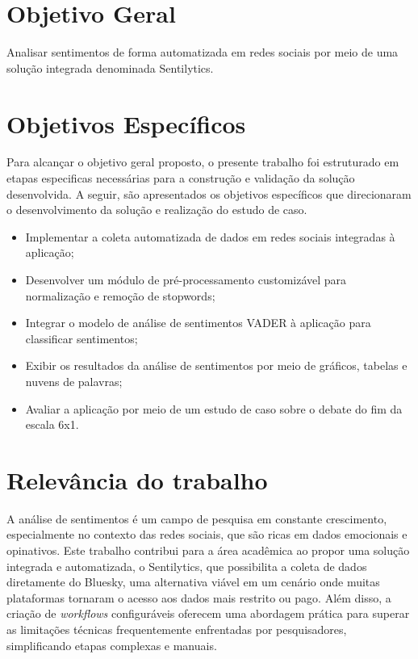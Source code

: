 \documentclass[
	12pt,				%
	oneside,			%
	a4paper,			%
	english,			%
	french,				%
	spanish,			%
	brazil				%
	]{abntex2}
\begin{document}
\hypertarget{objetivo-geral}{%
\section{Objetivo Geral}\label{objetivo-geral}}

Analisar sentimentos de forma automatizada em redes sociais por meio de
uma solução integrada denominada Sentilytics.

\hypertarget{objetivos-especuxedficos}{%
\section{Objetivos Específicos}\label{objetivos-especuxedficos}}

Para alcançar o objetivo geral proposto, o presente trabalho foi
estruturado em etapas especificas necessárias para a construção e
validação da solução desenvolvida. A seguir, são apresentados os
objetivos específicos que direcionaram o desenvolvimento da solução e
realização do estudo de caso.

\begin{itemize}
\tightlist
\item
  Implementar a coleta automatizada de dados em redes sociais integradas
  à aplicação;
\item
  Desenvolver um módulo de pré-processamento customizável para
  normalização e remoção de stopwords;
\item
  Integrar o modelo de análise de sentimentos VADER à aplicação para
  classificar sentimentos;
\item
  Exibir os resultados da análise de sentimentos por meio de gráficos,
  tabelas e nuvens de palavras;
\item
  Avaliar a aplicação por meio de um estudo de caso sobre o debate do
  fim da escala 6x1.
\end{itemize}

\hypertarget{relevuxe2ncia-do-trabalho}{%
\section{Relevância do trabalho}\label{relevuxe2ncia-do-trabalho}}

A análise de sentimentos é um campo de pesquisa em constante
crescimento, especialmente no contexto das redes sociais, que são ricas
em dados emocionais e opinativos. Este trabalho contribui para a área
acadêmica ao propor uma solução integrada e automatizada, o Sentilytics,
que possibilita a coleta de dados diretamente do Bluesky, uma
alternativa viável em um cenário onde muitas plataformas tornaram o
acesso aos dados mais restrito ou pago. Além disso, a criação de
\emph{workflows} configuráveis oferecem uma abordagem prática para
superar as limitações técnicas frequentemente enfrentadas por
pesquisadores, simplificando etapas complexas e manuais.
\end{document}
